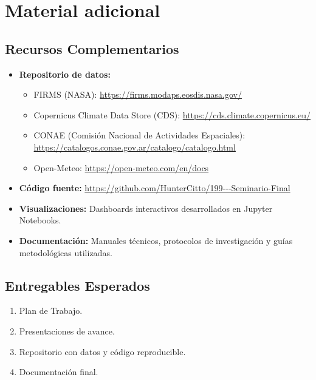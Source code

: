 \section{Material adicional}

\subsection{Recursos Complementarios}
\begin{itemize}
    \item \textbf{Repositorio de datos:} 
    \begin{itemize}
        \item FIRMS (NASA): \url{https://firms.modaps.eosdis.nasa.gov/}
        \item Copernicus Climate Data Store (CDS): \url{https://cds.climate.copernicus.eu/}
        \item CONAE (Comisión Nacional de Actividades Espaciales): \url{https://catalogos.conae.gov.ar/catalogo/catalogo.html}
        \item Open-Meteo: \url{https://open-meteo.com/en/docs}
    \end{itemize}
    \item \textbf{Código fuente:} \url{https://github.com/HunterCitto/199---Seminario-Final}
    \item \textbf{Visualizaciones:} Dashboards interactivos desarrollados en Jupyter Notebooks.
    \item \textbf{Documentación:} Manuales técnicos, protocolos de investigación y guías metodológicas utilizadas.
\end{itemize}

\subsection{Entregables Esperados}
\begin{enumerate}
    \item Plan de Trabajo.
    \item Presentaciones de avance.
    \item Repositorio con datos y código reproducible.
    \item Documentación final.
\end{enumerate}